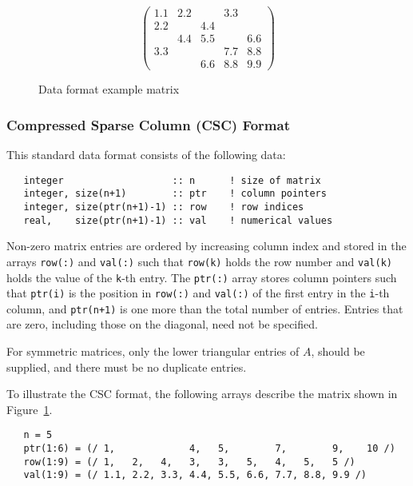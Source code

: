 \begin{figure}
   \caption{ \label{format eg}
      Data format example matrix
   }
   $$
      \left( \begin{array}{ccccc}
         1.1 & 2.2 &     & 3.3 &     \\
         2.2 &     & 4.4 &     &     \\
             & 4.4 & 5.5 &     & 6.6 \\
         3.3 &     &     & 7.7 & 8.8 \\
             &     & 6.6 & 8.8 & 9.9
      \end{array} \right)
   $$
\end{figure}

\subsubsection{Compressed Sparse Column (CSC) Format} \label{cscformat}
This standard data format consists of the following data:
\begin{verbatim}
   integer                   :: n      ! size of matrix
   integer, size(n+1)        :: ptr    ! column pointers
   integer, size(ptr(n+1)-1) :: row    ! row indices
   real,    size(ptr(n+1)-1) :: val    ! numerical values
\end{verbatim}
Non-zero matrix entries are ordered by increasing column index and stored in
the arrays \texttt{row(:)} and \texttt{val(:)} such that \texttt{row(k)} holds
the row number and \texttt{val(k)} holds the value of the \texttt{k}-th entry.
The \texttt{ptr(:)} array stores column pointers such that \texttt{ptr(i)} is
the position in \texttt{row(:)} and \texttt{val(:)} of
the first entry in the \texttt{i}-th column, and \texttt{ptr(n+1)} is one more
than the total number of entries.
Entries that are zero, including those on the diagonal, need not be specified.

For symmetric matrices, only the lower triangular entries of $A$, should be
supplied, and there must be no duplicate entries. 

To illustrate the CSC format, the following arrays describe the matrix shown in
Figure~\ref{format eg}.
\begin{verbatim}
   n = 5
   ptr(1:6) = (/ 1,             4,   5,        7,        9,    10 /)
   row(1:9) = (/ 1,   2,   4,   3,   3,   5,   4,   5,   5 /)
   val(1:9) = (/ 1.1, 2.2, 3.3, 4.4, 5.5, 6.6, 7.7, 8.8, 9.9 /)
\end{verbatim}



